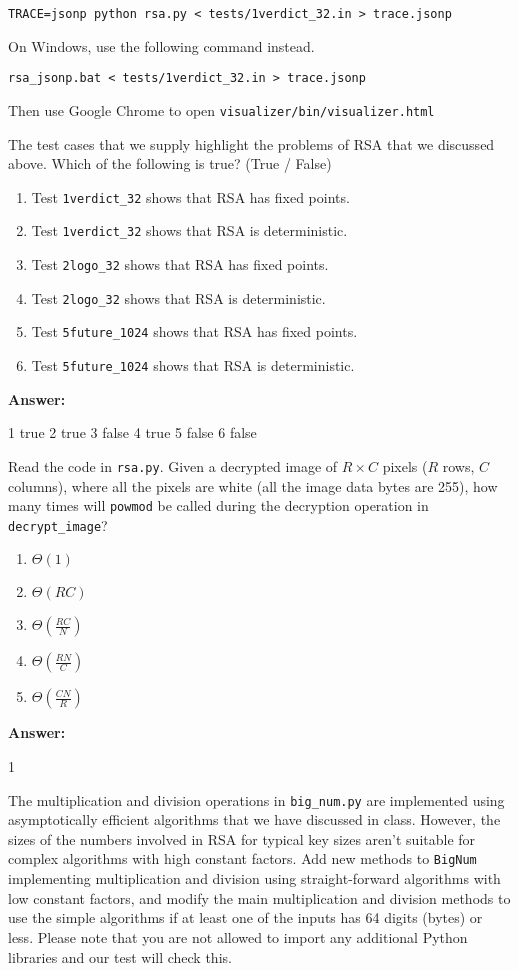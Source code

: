 \documentclass[12pt,twoside]{article}
\newcommand{\answer}{
 \par\medskip
 \textbf{Answer:}
}
\newcommand{\answerIIIe}{ \answer
1 true
2 true
3 false
4 true
5 false
6 false

}
\newcommand{\answerIIIf}{ \answer
1
}
\begin{document}
\begin{problems}
\texttt{TRACE=jsonp python rsa.py < tests/1verdict\_32.in > trace.jsonp}

On Windows, use the following command instead.

\texttt{rsa\_jsonp.bat < tests/1verdict\_32.in > trace.jsonp}

Then use Google Chrome to open
\texttt{visualizer/bin/visualizer.html}

\begin{problemparts}
\problempart {} The test cases that we supply highlight the problems of
RSA that we discussed above. Which of the following is true? (True / False)
\begin{enumerate}
  \item Test \texttt{1verdict\_32} shows that RSA has fixed points.
  \item Test \texttt{1verdict\_32} shows that RSA is deterministic.
  \item Test \texttt{2logo\_32} shows that RSA has fixed points.
  \item Test \texttt{2logo\_32} shows that RSA is deterministic.
  \item Test \texttt{5future\_1024} shows that RSA has fixed points.
  \item Test \texttt{5future\_1024} shows that RSA is deterministic.
\end{enumerate}
\answerIIIe

\problempart {} Read the code in \texttt{rsa.py}. Given a decrypted
image of $R \times C$ pixels ($R$ rows, $C$ columns), where all the pixels
are white (all the image data bytes are 255), how many times will
\texttt{powmod} be called during the decryption operation in
\texttt{decrypt\_image}?
\begin{enumerate}
  \item $\Theta(1)$
  \item $\Theta(R C)$
  \item $\Theta(\frac{RC}{N})$
  \item $\Theta(\frac{RN}{C})$
  \item $\Theta(\frac{CN}{R})$
\end{enumerate}
\answerIIIf

\problempart {} The multiplication and division operations in
\texttt{big\_num.py} are implemented using asymptotically efficient algorithms
that we have discussed in class. However, the sizes of the numbers involved in
RSA for typical key sizes aren't suitable for complex algorithms with high
constant factors. Add new methods to \texttt{BigNum} implementing multiplication
and division using straight-forward algorithms with low constant factors, and
modify the main multiplication and division methods to use the simple algorithms
if at least one of the inputs has 64 digits (bytes) or less. Please note that
you are not allowed to import any additional Python libraries and our test will
check this.
\end{problemparts}


\end{problems}
\end{document}
